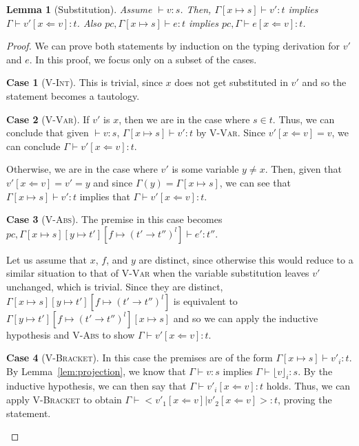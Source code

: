 \documentclass[a4paper]{article}
\newcommand{\typeRule}[3]{#1 \vdash #2 \colon #3}
\newcommand{\lift}[1]{\lfloor #1 \rfloor}
\theoremstyle{plain}
\newtheorem{lemma}{Lemma}
\theoremstyle{definition}
\newtheorem*{case}{Case}
\begin{document}
\begin{lemma}[Substitution]
  \label{lem:stuck_bracket}
  Assume $\typeRule{ }{v}{s}$.  Then, $\typeRule{\Gamma[x \mapsto s]}{v'}{t}$
  implies $\typeRule{\Gamma}{v'[x \Leftarrow v]}{t}$.  Also $\typeRule{pc,
  \Gamma[x \mapsto s]}{e}{t}$ implies $\typeRule{pc, \Gamma}{e[x \Leftarrow
  v]}{t}$.
\end{lemma}
\begin{proof}
  We can prove both statements by induction on the typing derivation for $v'$
  and $e$.  In this proof, we focus only on a subset of the cases.

  \begin{case}[\textsc{V-Int}]
    This is trivial, since $x$ does not get substituted in $v'$ and so the
    statement becomes a tautology.
  \end{case}

  \begin{case}[\textsc{V-Var}]
    If $v'$ is $x$, then we are in the case where $s \in t$.  Thus, we can
    conclude that given $\typeRule{ }{v}{s}$, $\typeRule{\Gamma[x \mapsto
    s]}{v'}{t}$ by \textsc{V-Var}.  Since $v'[x \Leftarrow v] = v$, we can
    conclude $\typeRule{\Gamma}{v'[x \Leftarrow v]}{t}$.

    Otherwise, we are in the case where $v'$ is some variable $y \neq x$.
    Then, given that $v'[x \Leftarrow v] = v' = y$ and since $\Gamma(y) =
    \Gamma[x \mapsto s]$, we can see that $\typeRule{\Gamma[x \mapsto
    s]}{v'}{t}$ implies that $\typeRule{\Gamma}{v'[x \Leftarrow v]}{t}$.
  \end{case}

  \begin{case}[\textsc{V-Abs}]
    The premise in this case becomes $\typeRule{pc, \Gamma[x \mapsto s][y
    \mapsto t'][f \mapsto (t' \to t'')^l]}{e'}{t''}$.

    Let us assume that $x$, $f$, and $y$ are distinct, since otherwise this
    would reduce to a similar situation to that of \textsc{V-Var} when the
    variable substitution leaves $v'$ unchanged, which is trivial.  Since they
    are distinct, $\Gamma[x \mapsto s][y \mapsto t'][f \mapsto (t' \to t'')^l]$
    is equivalent to $\Gamma[y \mapsto t'][f \mapsto (t' \to t'')^l][x \mapsto
    s]$ and so we can apply the inductive hypothesis and \textsc{V-Abs} to show
    $\typeRule{\Gamma}{v'[x \Leftarrow v]}{t}$.
  \end{case}

  \begin{case}[\textsc{V-Bracket}]
    In this case the premises are of the form $\typeRule{\Gamma[x \mapsto
    s]}{v'_i}{t}$.  By Lemma~\ref{lem:projection}, we know that
    $\typeRule{\Gamma}{v}{s}$ implies $\typeRule{\Gamma}{\lift{v}_i}{s}$.  By
    the inductive hypothesis, we can then say that $\typeRule{\Gamma}{v'_i[x
    \Leftarrow v]}{t}$ holds.  Thus, we can apply \textsc{V-Bracket} to obtain
    $\typeRule{\Gamma}{<v'_1[x \Leftarrow v] | v'_2[x \Leftarrow v]>}{t}$,
    proving the statement.
  \end{case}


\end{proof}
\end{document}

